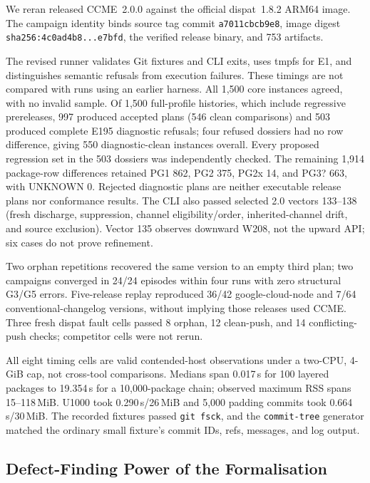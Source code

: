 \documentclass[10pt,conference]{IEEEtran}
\theoremstyle{definition}
\newcommand{\code}[1]{\texttt{#1}}
\begin{document}
We reran released CCME~2.0.0 against the official dispat~1.8.2 ARM64 image.
The campaign identity binds source tag commit \code{a7011cbcb9e8}, image digest
\code{sha256:4c0ad4b8...e7bfd}, the verified release binary, and 753 artifacts.

The revised runner validates Git fixtures and CLI exits, uses tmpfs for E1,
and distinguishes semantic refusals from execution failures. These timings
are not compared with runs using an earlier harness. All 1{,}500 core
instances agreed, with no invalid sample. Of 1{,}500 full-profile histories, which include
regressive prereleases, 997 produced accepted plans (546 clean comparisons)
and 503 produced complete E195 diagnostic refusals; four refused dossiers had
no row difference, giving 550 diagnostic-clean instances overall. Every
proposed regression set in the 503 dossiers was independently checked. The
remaining 1{,}914 package-row differences retained PG1 862, PG2 375, PG2x 14,
and PG3? 663, with UNKNOWN 0. Rejected diagnostic plans are neither executable
release plans nor conformance results. The CLI also
passed selected 2.0 vectors 133--138 (fresh discharge, suppression, channel
eligibility/order, inherited-channel drift, and source exclusion). Vector 135
observes downward W208, not the upward API; six cases do not prove refinement.

Two orphan repetitions recovered the same version to an empty third plan;
two campaigns converged in 24/24 episodes within four runs with zero structural
G3/G5 errors. Five-release replay reproduced 36/42 google-cloud-node and 7/64
conventional-changelog versions, without implying those releases used CCME.
Three fresh dispat fault cells passed 8 orphan, 12 clean-push, and 14
conflicting-push checks; competitor cells were not rerun.

All eight timing cells are valid contended-host observations under a two-CPU,
4-GiB cap, not cross-tool comparisons. Medians span 0.017\,s for 100 layered
packages to 19.354\,s for a 10{,}000-package chain; observed maximum RSS spans
15--118\,MiB. U1000 took 0.290\,s/26\,MiB and 5{,}000 padding commits took
0.664\,s/30\,MiB. The recorded fixtures passed \code{git fsck}, and the
\code{commit-tree} generator matched the ordinary small fixture's commit IDs,
refs, messages, and log output.

\subsection{Defect-Finding Power of the Formalisation}
\label{sec:eval:formal}
\end{document}
